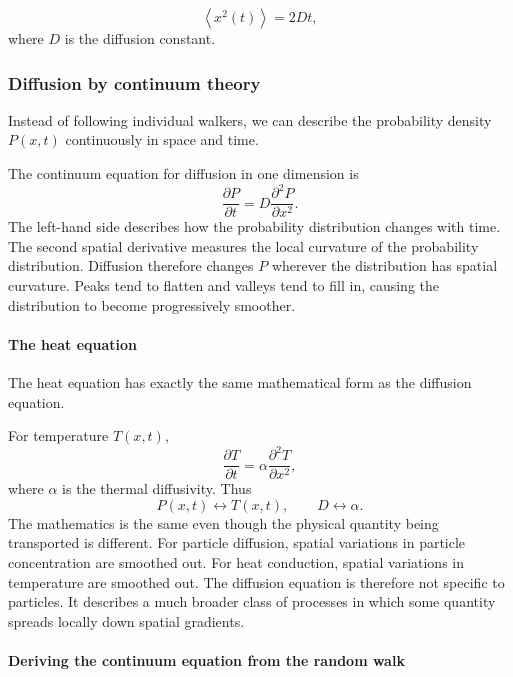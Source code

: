 \[ 
    \left\langle x^2(t) \right\rangle = 2Dt, 
\]
where $D$ is the diffusion constant.


\subsubsection{Diffusion by continuum theory}

Instead of following individual walkers, we can describe the probability density $P(x,t)$ continuously in space and time.

The continuum equation for diffusion in one dimension is
% 
\[ 
    \boxed{\frac{\partial P}{\partial t} = D\frac{\partial^2P}{\partial x^2}.} 
\]
% 
The left-hand side describes how the probability distribution changes with time.
The second spatial derivative measures the local curvature of the probability distribution.
Diffusion therefore changes $P$ wherever the distribution has spatial curvature.
Peaks tend to flatten and valleys tend to fill in, causing the distribution to become progressively smoother.


\paragraph{The heat equation}

The heat equation has exactly the same mathematical form as the diffusion equation.

For temperature $T(x,t)$,
% 
\[ 
    \boxed{\frac{\partial T}{\partial t} = \alpha\frac{\partial^2T}{\partial x^2},} 
\]
% 
where $\alpha$ is the thermal diffusivity.
Thus
% 
\[ 
    P(x,t) \longleftrightarrow T(x,t), \qquad D \longleftrightarrow \alpha. 
\]
% 
The mathematics is the same even though the physical quantity being transported is different.
For particle diffusion, spatial variations in particle concentration are smoothed out.
For heat conduction, spatial variations in temperature are smoothed out.
The diffusion equation is therefore not specific to particles.
It describes a much broader class of processes in which some quantity spreads locally down spatial gradients.


\paragraph{Deriving the continuum equation from the random walk}


